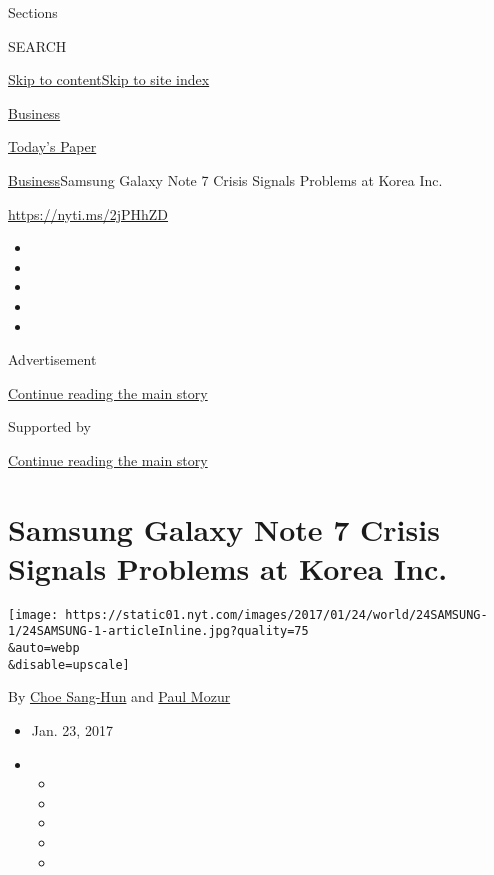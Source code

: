 Sections

SEARCH

\protect\hyperlink{site-content}{Skip to
content}\protect\hyperlink{site-index}{Skip to site index}

\href{https://www.nytimes.com/section/business}{Business}

\href{https://myaccount.nytimes.com/auth/login?response_type=cookie\&client_id=vi}{}

\href{https://www.nytimes.com/section/todayspaper}{Today's Paper}

\href{/section/business}{Business}\textbar{}Samsung Galaxy Note 7 Crisis
Signals Problems at Korea Inc.

\url{https://nyti.ms/2jPHhZD}

\begin{itemize}
\item
\item
\item
\item
\item
\end{itemize}

Advertisement

\protect\hyperlink{after-top}{Continue reading the main story}

Supported by

\protect\hyperlink{after-sponsor}{Continue reading the main story}

\hypertarget{samsung-galaxy-note-7-crisis-signals-problems-at-korea-inc}{%
\section{Samsung Galaxy Note 7 Crisis Signals Problems at Korea
Inc.}\label{samsung-galaxy-note-7-crisis-signals-problems-at-korea-inc}}

\texttt{[image: https://static01.nyt.com/images/2017/01/24/world/24SAMSUNG-1/24SAMSUNG-1-articleInline.jpg?quality=75\\\&auto=webp\\\&disable=upscale]}

By \href{http://www.nytimes.com/by/choe-sang-hun}{Choe Sang-Hun} and
\href{https://www.nytimes.com/by/paul-mozur}{Paul Mozur}

\begin{itemize}
\item
  Jan. 23, 2017
\item
  \begin{itemize}
  \item
  \item
  \item
  \item
  \item
  \end{itemize}
\end{itemize}

